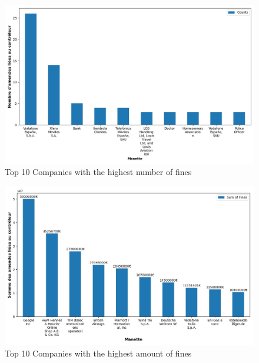 \documentclass[12pt]{article}
\begin{document}
	\begin{figure}
		[H]\centering\includegraphics[width=0.6\linewidth]{graphs/top10_controller}
		\caption{Top 10 Companies with the highest number of fines}
	\end{figure}
	
	\begin{figure}
		[H]\centering\includegraphics[width=0.6\linewidth]{graphs/top10_controller_fines}
		\caption{Top 10 Companies with the highest amount of fines}
	 \end{figure}



\newpage
\end{document}
